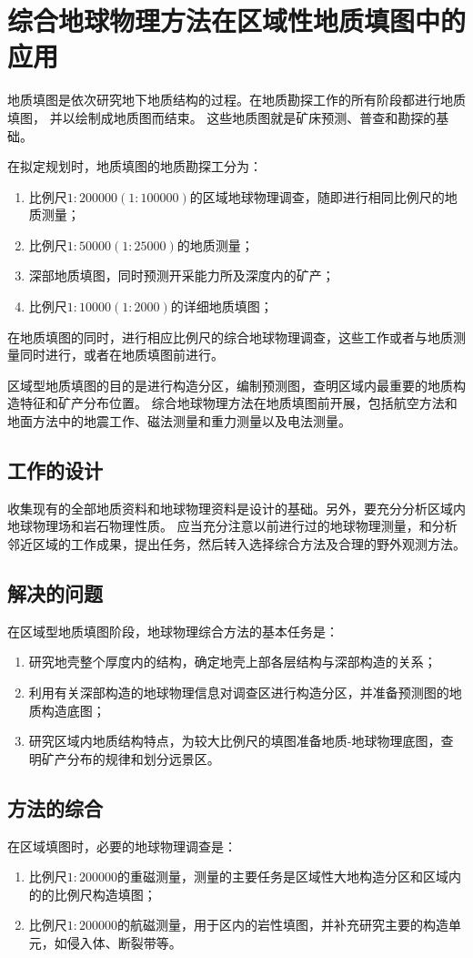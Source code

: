 \documentclass[hyperref,UTF-8]{ctexart}
\begin{document}
\section{综合地球物理方法在区域性地质填图中的应用}
地质填图是依次研究地下地质结构的过程。在地质勘探工作的所有阶段都进行地质填图，
并以绘制成地质图而结束。
这些地质图就是矿床预测、普查和勘探的基础。

在拟定规划时，地质填图的地质勘探工分为：
\begin{enumerate}
\item 比例尺$1:200000(1:100000)$的区域地球物理调查，随即进行相同比例尺的地质测量；
\item 比例尺$1:50000(1:25000)$的地质测量；
\item 深部地质填图，同时预测开采能力所及深度内的矿产；
\item 比例尺$1:10000(1:2000)$的详细地质填图；
\end{enumerate}
在地质填图的同时，进行相应比例尺的综合地球物理调查，这些工作或者与地质测量同时进行，或者在地质填图前进行。

区域型地质填图的目的是进行构造分区，编制预测图，查明区域内最重要的地质构造特征和矿产分布位置。
综合地球物理方法在地质填图前开展，包括航空方法和地面方法中的地震工作、磁法测量和重力测量以及电法测量。
\subsection{工作的设计}
收集现有的全部地质资料和地球物理资料是设计的基础。另外，要充分分析区域内地球物理场和岩石物理性质。
应当充分注意以前进行过的地球物理测量，和分析邻近区域的工作成果，提出任务，然后转入选择综合方法及合理的野外观测方法。
\subsection{解决的问题}
在区域型地质填图阶段，地球物理综合方法的基本任务是：
\begin{enumerate}
\item 研究地壳整个厚度内的结构，确定地壳上部各层结构与深部构造的关系；
\item 利用有关深部构造的地球物理信息对调查区进行构造分区，并准备预测图的地质构造底图；
\item 研究区域内地质结构特点，为较大比例尺的填图准备地质-地球物理底图，查明矿产分布的规律和划分远景区。
\end{enumerate}
\subsection{方法的综合}
在区域填图时，必要的地球物理调查是：
\begin{enumerate}
\item 比例尺$1:200000$的重磁测量，测量的主要任务是区域性大地构造分区和区域内的的比例尺构造填图；
\item 比例尺$1:200000$的航磁测量，用于区内的岩性填图，并补充研究主要的构造单元，如侵入体、断裂带等。
\end{enumerate}
\end{document}
